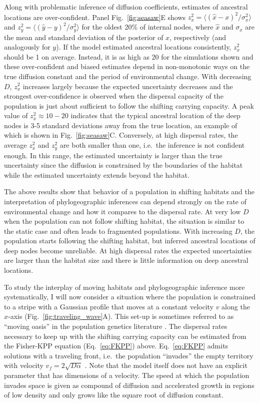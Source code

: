 \documentclass[aps,rmp, twocolumn]{revtex4}
\newcommand{\vfkpp}{v_f}
\begin{document}
Along with problematic inference of diffusion coefficients, estimates of ancestral locations are over-confident.
Panel Fig.~\ref{fig:seasaw}E shows $z_x^2 = \langle (\hat{x} - x)^2/\sigma_x^2 \rangle$ and $z_y^2=\langle (\hat{y} - y)^2/\sigma_y^2\rangle$ for the oldest 20\% of internal nodes, where $\hat{x}$ and $\sigma_x$ are the mean and standard deviation of the posterior of $x$, respectively (and analogously for $y$).
If the model estimated ancestral locations consistently, $z_x^2$ should be 1 on average.
Instead, it is as high as 20 for the simulations shown and these over-confident and biased estimates depend in non-monotonic ways on the true diffusion constant and the period of environmental change.
With decreasing $D$, $z_x^2$ increases largely because the expected uncertainty decreases and the strongest over-confidence is observed when the dispersal capacity of the population is just about sufficient to follow the shifting carrying capacity.
A peak value of $z_x^2\approx 10-20$ indicates that the typical ancestral location of the deep nodes is 3-5 standard deviations away from the true location, an example of which is shown in Fig.~\ref{fig:seasaw}C.
Conversely, at high dispersal rates, the average $z_x^2$ and $z_y^2$ are both smaller than one, i.e.~the inference is not confident enough.
In this range, the estimated uncertainty is larger than the true uncertainty since the diffusion is constrained by the boundaries of the habitat while the estimated uncertainty extends beyond the habitat.

The above results show that behavior of a population in shifting habitats and the interpretation of phylogeographic inferences can depend strongly on the rate of environmental change and how it compares to the dispersal rate.
At very low $D$ when the population can not follow shifting habitat, the situation is similar to the static case and often leads to fragmented populations.
With increasing $D$, the population starts following the shifting habitat, but inferred ancestral locations of deep nodes become unreliable.
At high dispersal rates the expected uncertainties are larger than the habitat size and there is little information on deep ancestral locations.

To study the interplay of moving habitats and phylogeographic inference more systematically, I will now consider a situation where the population is constrained to a stripe with a Gaussian profile that moves at a constant velocity $v$ along the $x$-axis (Fig.~\ref{fig:traveling_wave}A).
This set-up is sometimes referred to as ``moving oasis'' in the population genetics literature \citep{desai_quasispecies_2005}.
The dispersal rates necessary to keep up with the shifting carrying capacity can be estimated from the Fisher-KPP equation (Eq.~\ref{eq:FKPP}) above.
Eq.~\ref{eq:FKPP} admits solutions with a traveling front, i.e.~the population ``invades'' the empty territory with velocity $\vfkpp = 2\sqrt{D \alpha}$ \citep{fisher_wave_1937,KPP1937,hallatschek_life_2010}.
Note that the model itself does not have an explicit parameter that has dimensions of a velocity.
The speed at which the population invades space is given as compound of diffusion and accelerated growth in regions of low density and only grows like the square root of diffusion constant.
\end{document}
